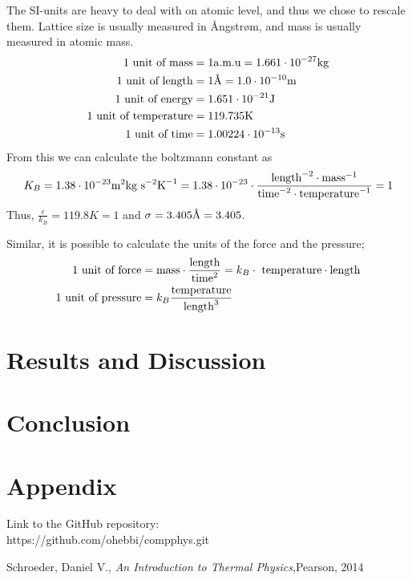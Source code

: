 \documentclass{article}
\begin{document}
The SI-units are heavy to deal with on atomic level, and thus we chose to rescale them. Lattice size is usually measured in Ångstrøm, and mass is usually measured in atomic mass.
\begin{align}
	1 \textnormal{ unit of mass} &= 1 \textnormal{a.m.u} = 1.661\cdot 10^{-27} \textnormal{kg}\\
	1 \textnormal{ unit of length} &= 1 \textnormal{Å} = 1.0\cdot 10^{-10} \textnormal{m}\\
	1 \textnormal{ unit of energy} &= 1.651\cdot 10^{-21}\textnormal{J}\\
	1 \textnormal{ unit of temperature} &= 119.735\textnormal{K}\\
	1 \textnormal{ unit of time} &= 1.00224\cdot 10^{-13} \textnormal{s}
\end{align}
From this we can calculate the boltzmann constant as
\begin{align}
	K_B = 1.38\cdot 10^{-23} \textnormal{m}^2\textnormal{kg}\textnormal{ s}^{-2}\textnormal{K}^{-1}= 1.38\cdot 10^{-23} \cdot \frac{\textnormal{length}^{-2}\cdot\textnormal{mass}^{-1}}{\textnormal{time}^{-2}\cdot\textnormal{temperature}^{-1}}=1
\end{align}
Thus, $\frac{\epsilon}{k_B}=119.8K=1$ and $\sigma = 3.405 \textnormal{Å}= 3.405$.

Similar, it is possible to calculate the units of the force and the pressure;
\begin{align}
	\textnormal{1 unit of force} &= \textnormal{mass}\cdot\frac{\textnormal{length}}{\textnormal{time}^2} = k_B \cdot \textnormal{ temperature}\cdot\textnormal{length}\\
	\textnormal{1 unit of pressure} &=k_B \frac{\textnormal{temperature}}{\textnormal{length}^3}
\end{align}

\section{Results and Discussion}





\section{Conclusion}


\section{Appendix}
Link to the GitHub repository:\\

https://github.com/ohebbi/compphys.git

\begin{thebibliography}{}
Schroeder, Daniel V., \textit{An Introduction to Thermal Physics},Pearson, 2014\\
\end{thebibliography}
\end{document}
